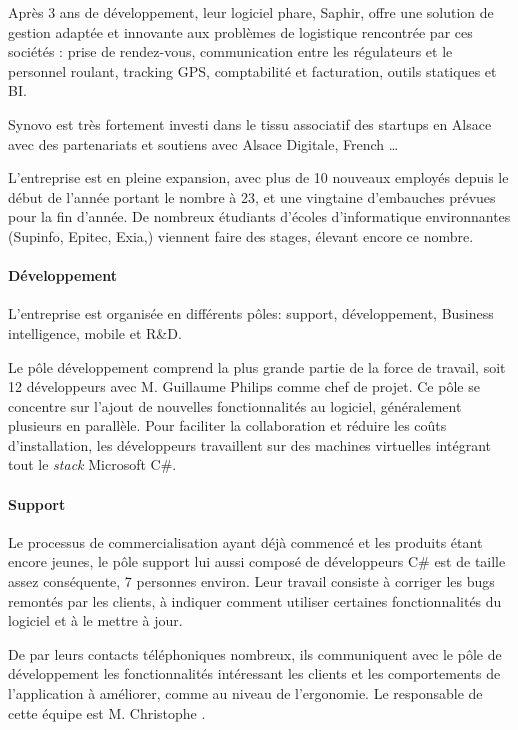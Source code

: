 \documentclass[french, 11pt]{memoir}
\begin{document}
Après 3 ans de développement, leur logiciel phare, Saphir, offre une
solution de gestion adaptée et innovante aux problèmes de logistique
rencontrée par ces sociétés : prise de rendez-vous, communication entre
les régulateurs et le personnel roulant, tracking GPS, comptabilité et
facturation, outils statiques et BI.

Synovo est très fortement investi dans le tissu associatif des startups
en Alsace avec des partenariats et soutiens avec Alsace Digitale, French
\ldots{}

L'entreprise est en pleine expansion, avec plus de 10 nouveaux employés
depuis le début de l'année portant le nombre à 23, et une vingtaine
d'embauches prévues pour la fin d'année. De nombreux étudiants d'écoles
d'informatique environnantes (Supinfo, Epitec, Exia,) viennent faire des
stages, élevant encore ce nombre.

\paragraph{Développement}\label{duxe9veloppement}

L'entreprise est organisée en différents pôles: support, développement,
Business intelligence, mobile et R\&D.

Le pôle développement comprend la plus grande partie de la force de
travail, soit 12 développeurs avec M. Guillaume Philips comme chef de
projet. Ce pôle se concentre sur l'ajout de nouvelles fonctionnalités au
logiciel, généralement plusieurs en parallèle. Pour faciliter la
collaboration et réduire les coûts d'installation, les développeurs
travaillent sur des machines virtuelles intégrant tout le \emph{stack}
Microsoft C\#.

\paragraph{Support}\label{support}

Le processus de commercialisation ayant déjà commencé et les produits
étant encore jeunes, le pôle support lui aussi composé de développeurs
C\# est de taille assez conséquente, 7 personnes environ. Leur travail
consiste à corriger les bugs remontés par les clients, à indiquer
comment utiliser certaines fonctionnalités du logiciel et à le mettre à
jour.

De par leurs contacts téléphoniques nombreux, ils communiquent avec le
pôle de développement les fonctionnalités intéressant les clients et les
comportements de l'application à améliorer, comme au niveau de
l'ergonomie. Le responsable de cette équipe est M. Christophe .
\end{document}
